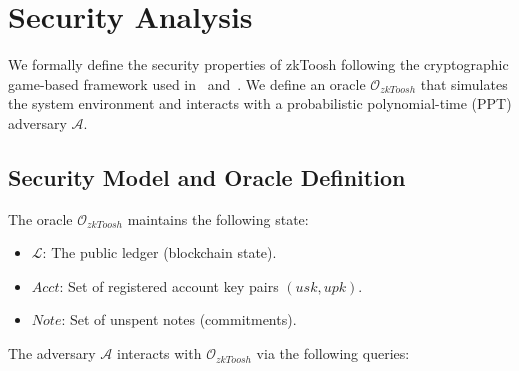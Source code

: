 \documentclass[conference]{IEEEtran}
\begin{document}
\begin{algorithm}[t]
\caption{StealthAddressGen($pk_{view}, r$)}
\label{alg:stealth}
\end{algorithm}

% 
% 
\section{Security Analysis}
\label{sec:security}

We formally define the security properties of zkToosh following the cryptographic game-based framework used in~\cite{azeroth2023} and~\cite{zerocash2014}. We define an oracle $_{zkToosh}$ that simulates the system environment and interacts with a probabilistic polynomial-time (PPT) adversary $$.

\subsection{Security Model and Oracle Definition}

The oracle $_{zkToosh}$ maintains the following state:
\begin{itemize}
    \item $$: The public ledger (blockchain state).
    \item $Acct$: Set of registered account key pairs $(usk, upk)$.
    \item $Note$: Set of unspent notes (commitments).
\end{itemize}

The adversary $$ interacts with $_{zkToosh}$ via the following queries:
\end{document}
